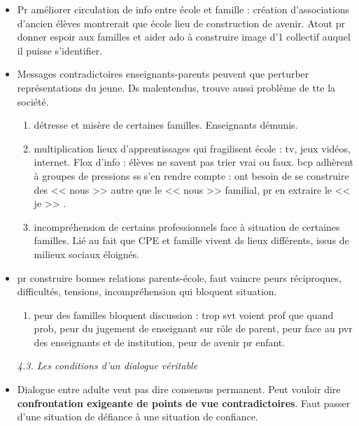 \documentclass[12pt]{article}
\begin{document}
\begin{itemize}
\vspace{0.5cm}

\item Pr améliorer circulation de info entre école et famille : création d'associations d'ancien élèves montrerait que école lieu de construction de avenir. Atout pr donner espoir aux familles et aider ado à construire image d'1 collectif auquel il puisse s'identifier.\\

\item Messages contradictoires enseignants-parents peuvent que perturber représentations du jeune. Ds malentendus, trouve aussi problème de tte la société.
\begin{enumerate}
\item détresse et misère de certaines familles. Enseignants démunis.\\
\item multiplication lieux d'apprentissages qui fragilisent école : tv, jeux vidéos, internet. Flox d'info : élèves ne savent pas trier vrai ou faux. bcp adhèrent à groupes de pressions ss s'en rendre compte : ont besoin de se construire des << nous >> autre que le << nous >> familial, pr en extraire le << je >> . \\
\item incompréhension de certains professionnels face à situation de certaines familles. Lié au fait que CPE et famille vivent ds lieux différents, issus de milieux sociaux éloignés.\\
\end{enumerate}

\item pr construire bonnes relations parents-école, faut vaincre peurs réciproques, difficultés, tensions, incompréhension qui bloquent situation.
\begin{enumerate}
\item peur des familles bloquent discussion : trop svt voient prof que quand prob, peur du jugement de enseignant sur rôle de parent, peur face au pvr des enseignants et de institution, peur de avenir pr enfant.\\
\end{enumerate}

\textit{4.3. Les conditions d'un dialogue véritable}

\item Dialogue entre adulte veut pas dire consensus permanent. Peut vouloir dire \textbf{confrontation exigeante de points de vue contradictoires}. Faut passer d'une situation de défiance à une situation de confiance.


\end{itemize}
\end{document}
